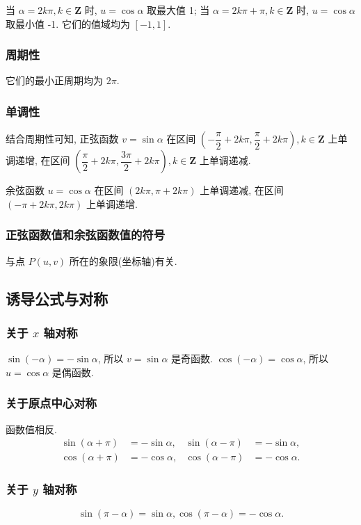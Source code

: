 \documentclass[titlepage]{ctexart}
\begin{document}
当 $\alpha = 2k\pi, k\in \mathbf{Z}$ 时, $u = \cos \alpha$ 取最大值 1;
当 $\alpha = 2k\pi + \pi, k\in \mathbf{Z}$ 时, $u = \cos \alpha$ 取最小值 -1.
它们的值域均为 $[-1, 1]$.

\subsubsection{周期性}
它们的最小正周期均为 $2\pi$.

\subsubsection{单调性}
结合周期性可知, 正弦函数 $v = \sin \alpha$ 在区间 $(-\dfrac{\pi}{2} + 2k\pi, \dfrac{\pi}{2} + 2k\pi), k\in \mathbf{Z}$ 上单调递增, 
在区间 $(\dfrac{\pi}{2} + 2k\pi, \dfrac{3\pi}{2} + 2k\pi), k\in \mathbf{Z}$ 上单调递减.

余弦函数 $u = \cos \alpha$ 在区间 $(2k\pi, \pi + 2k\pi)$ 上单调递减,
在区间 $(-\pi + 2k\pi, 2k\pi)$ 上单调递增.

\subsubsection{正弦函数值和余弦函数值的符号}
与点 $P(u, v)$ 所在的象限(坐标轴)有关.

\subsection{诱导公式与对称}

\subsubsection{关于 $x$ 轴对称}
$\sin(- \alpha) = - \sin \alpha$, 所以 $v = \sin \alpha$ 是奇函数.
$\cos(- \alpha) = \cos \alpha$, 所以 $u = \cos \alpha$ 是偶函数.

\subsubsection{关于原点中心对称}
函数值相反.
\begin{align*}
    \sin(\alpha + \pi) &= - \sin \alpha, & \sin(\alpha - \pi) &= - \sin \alpha, \\
    \cos(\alpha + \pi) &= - \cos \alpha, & \cos(\alpha - \pi) &= - \cos \alpha.
\end{align*}

\subsubsection{关于 $y$ 轴对称}
\[
\sin(\pi - \alpha) = \sin \alpha, \cos(\pi - \alpha) = - \cos \alpha.
\]
\end{document}
